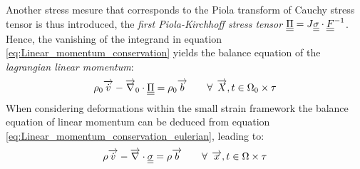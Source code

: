 Another stress mesure that corresponds to the Piola transform of Cauchy stress tensor is thus introduced, the \textit{first Piola-Kirchhoff stress tensor} ${\underline{\underline{\Pi}}}=J{\underline{\underline{\sigma}}}\cdot{\underline{\underline{F}}}^{-1}$. Hence, the vanishing of the integrand in equation \eqref{eq:Linear_momentum_conservation} yields the balance equation of the \textit{lagrangian linear momentum}:
\begin{equation}
  \label{eq:Lagrangian_linear_momentum}
  \rho_0 {\overrightarrow{\dot{v}}} - {\overrightarrow{\nabla}}_0 \cdot {\underline{\underline{\Pi}}} = \rho_0 {\overrightarrow{b}} \qquad \forall \: \: {\overrightarrow{X}},t \in \Omega_0 \times \tau 
\end{equation}
When considering deformations within the small strain framework the balance equation of linear momentum can be deduced from equation \eqref{eq:Linear_momentum_conservation_eulerian}, leading to:
\begin{equation}
  \label{eq:HPP_linear_momentum}
  \rho {\overrightarrow{\dot{v}}} - {\overrightarrow{\nabla}} \cdot {\underline{\underline{\sigma}}} = \rho {\overrightarrow{b}}  \qquad \forall \: \: {\overrightarrow{x}},t \in \Omega \times \tau 
\end{equation}

